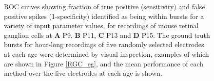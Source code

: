 \documentclass[12pt, titlepage]{article}
\begin{document}
		\begin{figure}[h]
			\centering
			\caption{ROC curves showing fraction of true positive (sensitivity) and false positive spikes (1-specificity) identified as being within bursts for a variety of input parameter values, for recordings of mouse retinal ganglion cells at \textbf{A} P9, \textbf{B} P11,  \textbf{C} P13 and \textbf{D} P15. The ground truth bursts for hour-long recordings of five randomly selected electrodes at each age were determined by visual inspection, examples of which are shown in Figure \ref{RGC_eg}, and the mean performance of each method over the five electrodes at each age is shown.}
			\label{ROC}
		\end{figure}  
\end{document}

